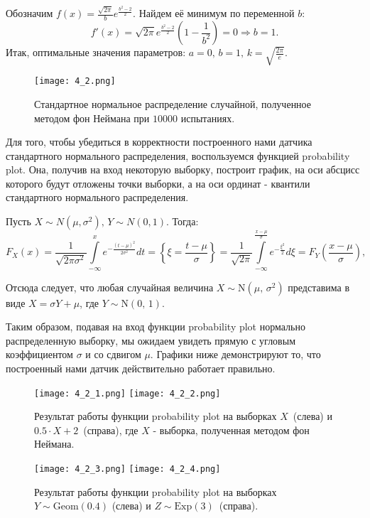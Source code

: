 \documentclass[a4paper, 11pt]{article}
\theoremstyle{def}
\theoremstyle{th}
\theoremstyle{rem}
\begin{document}
Обозначим $\displaystyle f(x) = \frac{\sqrt{2\pi}}{b}e^\frac{b^2-2}{2}$. Найдем её минимум по переменной $b$:
$$
\displaystyle
f'(x) = \sqrt{2\pi}e^\frac{b^2-2}{2}\left(1-\frac{1}{b^2}\right) = 0 \Rightarrow b=1.
$$
Итак, оптимальные значения параметров: $\displaystyle a=0, \,b=1, \,k = \sqrt{\frac{2\pi}{e}}$.
\begin{figure}[H]
        \centering
        \texttt{[image: 4\_2.png]}
        \caption{Стандартное нормальное распределение случайной, полученное методом фон Неймана при $10000$ испытаниях.}
\end{figure}
Для того, чтобы убедиться в корректности построенного нами датчика стандартного нормального распределения, воспользуемся функцией probability plot. Она, получив на вход некоторую выборку, построит график, на оси абсцисс которого будут отложены точки выборки, а на оси ординат - квантили стандартного нормального распределения.

Пусть $X \sim N(\mu, \sigma^2), \, Y \sim N(0, 1)$. Тогда:
$$
F_X(x) = \frac{1}{\sqrt{2\pi\sigma^2}}\int\limits_{-\infty}^{x}e^{-\frac{(t-\mu)^2}{2\sigma^2}}dt = \left\{\xi = \frac{t-\mu}{\sigma}\right\} = \frac{1}{\sqrt{2\pi}}\int\limits_{-\infty}^{\frac{x-\mu}{\sigma}}e^{-\frac{\xi^2}{2}}d\xi = F_Y\left(\frac{x-\mu}{\sigma}\right),
$$

Отсюда следует, что любая случайная величина $X \sim \mbox{N}(\mu,\,\sigma^2)$ представима в виде $X = \sigma Y + \mu$, где $Y \sim \mbox{N}(0,\,1)$.

Таким образом, подавая на вход функции probability plot нормально распределенную выборку, мы ожидаем увидеть прямую с угловым коэффициентом $\sigma$ и со сдвигом $\mu$. Графики ниже демонстрируют то, что построенный нами датчик действительно работает правильно. 

\begin{figure}[H]
        \texttt{[image: 4\_2\_1.png]}
        \texttt{[image: 4\_2\_2.png]}
        \caption{Результат работы функции probability plot на выборках $X$~(слева) и $0.5 \cdot X + 2$~(справа), где $X$ - выборка, полученная методом фон Неймана.}
\end{figure}
\begin{figure}[H]
        \texttt{[image: 4\_2\_3.png]}
        \texttt{[image: 4\_2\_4.png]}
        \caption{Результат работы функции probability plot на выборках $Y \sim \mbox{Geom}(0.4)$ (слева) и $Z \sim \mbox{Exp}(3)$~(справа).}
\end{figure}
\end{document}
